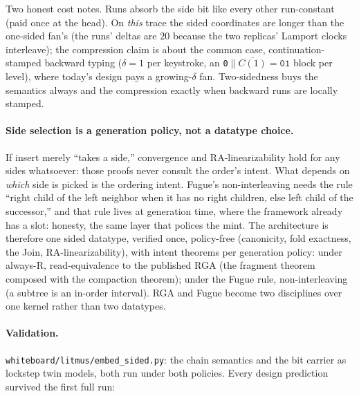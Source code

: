 \documentclass[11pt]{article}
\newcommand{\code}[1]{\texttt{#1}}
\begin{document}
Two honest cost notes. Runs absorb the side bit like every other
run-constant (paid once at the head). On \emph{this} trace the sided
coordinates are longer than the one-sided fan's (the runs' deltas are
$20$ because the two replicas' Lamport clocks interleave); the
compression claim is about the common case, continuation-stamped
backward typing ($\delta = 1$ per keystroke, an \code{0}$\|
\overline{C(1)} = \code{01}$ block per level), where today's design
pays a growing-$\delta$ fan. Two-sidedness buys the semantics always
and the compression exactly when backward runs are locally stamped.

\paragraph{Side selection is a generation policy, not a datatype
choice.} If insert merely ``takes a side,'' convergence and
RA-linearizability hold for any sides whatsoever: those proofs never
consult the order's intent. What depends on \emph{which} side is
picked is the ordering intent. Fugue's non-interleaving needs the rule
``right child of the left neighbor when it has no right children, else
left child of the successor,'' and that rule lives at generation time,
where the framework already has a slot: honesty, the same layer that
polices the mint. The architecture is therefore one sided datatype,
verified once, policy-free (canonicity, fold exactness, the Join,
RA-linearizability), with intent theorems per generation policy: under
always-R, read-equivalence to the published RGA (the fragment theorem
composed with the compaction theorem); under the Fugue rule,
non-interleaving (a subtree is an in-order interval). RGA and Fugue
become two disciplines over one kernel rather than two datatypes.

\paragraph{Validation.} \code{whiteboard/litmus/embed\_sided.py}: the
chain semantics and the bit carrier as lockstep twin models, both run
under both policies. Every design prediction survived the first full
run:
\end{document}
